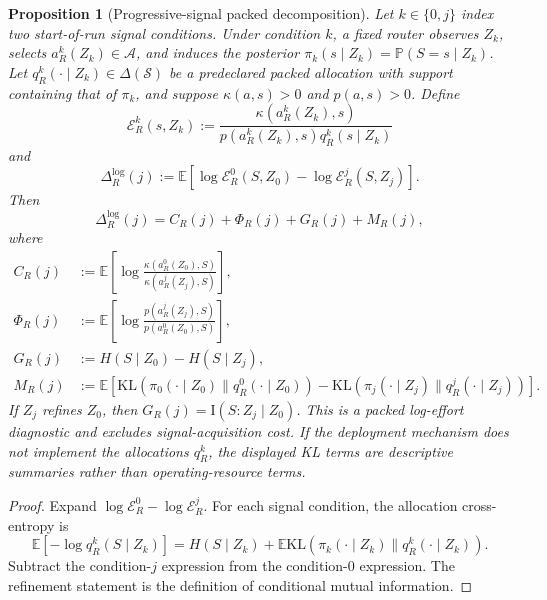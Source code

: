\documentclass[10pt]{article}
\theoremstyle{paperplain}
\newtheorem{proposition}[theorem]{Proposition}
\theoremstyle{paperdefinition}
\theoremstyle{paperremark}
\newcommand{\KL}{\mathrm{KL}}
\newcommand{\I}{\mathrm{I}}
\newcommand{\E}{\mathbb{E}}
\newcommand{\Prb}{\mathbb{P}}
\newcommand{\cA}{\mathcal{A}}
\newcommand{\cS}{\mathcal{S}}
\begin{document}
\begin{proposition}[Progressive-signal packed decomposition]
\label{prop:progressive-signal-decomposition}
Let \(k\in\{0,j\}\) index two start-of-run signal conditions.  Under condition
\(k\), a fixed router observes \(Z_k\), selects
\(a_R^k(Z_k)\in\cA\), and induces the posterior
\(\pi_k(s\mid Z_k)=\Prb(S=s\mid Z_k)\).  Let
\(q_R^k(\cdot\mid Z_k)\in\Delta(\cS)\) be a predeclared packed allocation with
support containing that of \(\pi_k\), and suppose
\(\kappa(a,s)>0\) and \(p(a,s)>0\).  Define
\[
\mathcal E_R^k(s,Z_k)
:=
\frac{\kappa(a_R^k(Z_k),s)}
{p(a_R^k(Z_k),s)q_R^k(s\mid Z_k)}
\]
and
\[
\Delta_R^{\log}(j)
:=\E[\log\mathcal E_R^0(S,Z_0)-\log\mathcal E_R^j(S,Z_j)].
\]
Then
\[
\Delta_R^{\log}(j)=C_R(j)+\Phi_R(j)+G_R(j)+M_R(j),
\]
where
\begin{align*}
C_R(j)
&:=\E\!\left[
\log\frac{\kappa(a_R^0(Z_0),S)}{\kappa(a_R^j(Z_j),S)}
\right],\\
\Phi_R(j)
&:=\E\!\left[
\log\frac{p(a_R^j(Z_j),S)}{p(a_R^0(Z_0),S)}
\right],\\
G_R(j)
&:=H(S\mid Z_0)-H(S\mid Z_j),\\
M_R(j)
&:=\E\!\left[
\KL(\pi_0(\cdot\mid Z_0)\|q_R^0(\cdot\mid Z_0))
-\KL(\pi_j(\cdot\mid Z_j)\|q_R^j(\cdot\mid Z_j))
\right].
\end{align*}
If \(Z_j\) refines \(Z_0\), then
\(G_R(j)=\I(S:Z_j\mid Z_0)\).  This is a packed log-effort diagnostic and
excludes signal-acquisition cost.  If the deployment mechanism does not
implement the allocations \(q_R^k\), the displayed KL terms are descriptive
summaries rather than operating-resource terms.
\end{proposition}

\begin{proof}
Expand \(\log\mathcal E_R^0-\log\mathcal E_R^j\).  For each signal condition,
the allocation cross-entropy is
\[
\E[-\log q_R^k(S\mid Z_k)]
=H(S\mid Z_k)
+\E\KL(\pi_k(\cdot\mid Z_k)\|q_R^k(\cdot\mid Z_k)).
\]
Subtract the condition-\(j\) expression from the condition-0 expression.  The
refinement statement is the definition of conditional mutual information.
\end{proof}
\end{document}
